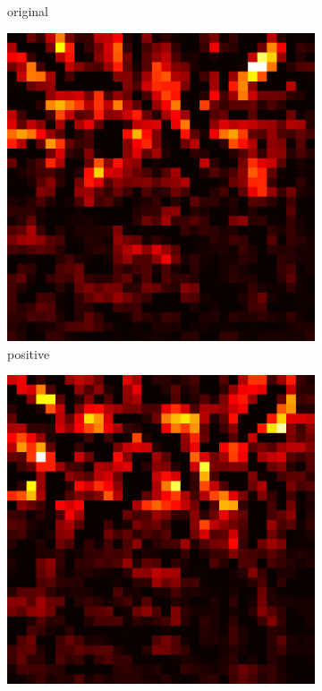 \documentclass[preprint,12pt]{elsarticle}
\begin{document}
\begin{figure}
\begin{subfigure}{0.14\linewidth}
        \caption{original}
    \end{subfigure}
    \hfill
    \begin{subfigure}{0.14\textwidth}
        \centering
        \includegraphics[width=\linewidth]{../visualizations/examples/cifar10/cnn/positive_saliency_map/5.png}
        \caption{positive}
    \end{subfigure}
    \hfill
    \begin{subfigure}{0.14\textwidth}
        \centering
        \includegraphics[width=\linewidth]{../visualizations/examples/cifar10/cnn/negative_saliency_map/5.png}

\end{subfigure}
\end{figure}
\end{document}

